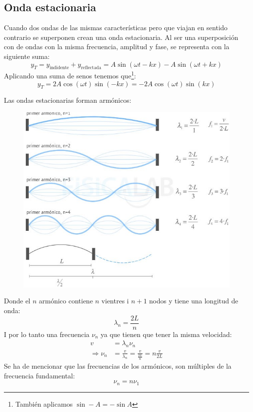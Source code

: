 \documentclass[arial,a4paper,print]{article}
\begin{document}
\subsection{Onda estacionaria}
Cuando dos ondas de las mismas características pero que viajan en sentido contrario se superponen crean una onda estacionaria. Al ser una superposición con de ondas con la misma frecuencia, amplitud y fase, se representa con la siguiente suma:
\begin{equation*}
	y_{T} = y_{\text{indidente}} + y_{\text{reflectada}} = A\sin(\omega t -kx)-A\sin(\omega t + kx)
\end{equation*}
Aplicando una suma de senos tenemos que\footnote{También aplicamos $\sin-A = -\sin A$}:
\begin{equation*}
	y_{T} = 2A\cos(\omega t) \sin(-kx) = -2A\cos(\omega t)\sin(kx)
\end{equation*}

\pagebreak
Las ondas estacionarias forman armónicos: 
\begin{figure}[h]
	\centering
	\includegraphics[width=0.6\linewidth]{onda-estacionaria-cuerda-fija}
	\caption{}
	\label{fig:onda-estacionaria-cuerda-fija}
\end{figure}
Donde el $n$ armónico contiene $n$ vientres i $n+1$ nodos y tiene una longitud de onda:
\begin{equation*}
	\lambda_{n} = \frac{2L}{n}
\end{equation*}
I por lo tanto una frecuencia $\nu_{n}$ ya que tienen que tener la misma velocidad:
\begin{align}
	v &= \lambda_{n}\nu_{n} \\
	\Rightarrow \nu_{n} &= \frac{v}{\lambda_{n}} = \frac{v}{\frac{2L}{n}} = n\frac{v}{2L}
\end{align}
Se ha de mencionar que las frecuencias de los armónicos, son múltiples de la frecuencia fundamental:
\begin{equation*}
	\nu_n = n\nu_1
\end{equation*}
\end{document}
